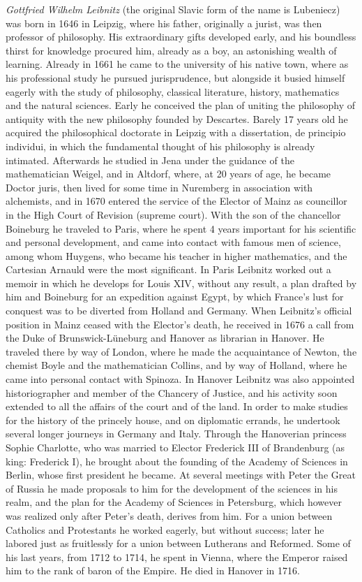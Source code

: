 \emph{Gottfried Wilhelm Leibnitz} (the original Slavic form of the
name is Lubeniecz) was born in 1646 in Leipzig, where his father,
originally a jurist, was then professor of philosophy. His
extraordinary gifts developed early, and his boundless thirst for
knowledge procured him, already as a boy, an astonishing wealth of
learning. Already in 1661 he came to the university of his native town,
where as his professional study he pursued jurisprudence, but alongside
it busied himself eagerly with the study of philosophy, classical
literature, history, mathematics and the natural sciences. Early he
conceived the plan of uniting the philosophy of antiquity with the new
philosophy founded by Descartes. Barely 17 years old he acquired the
philosophical doctorate in Leipzig with a dissertation, de principio
individui, in which the fundamental thought of his philosophy is already
intimated. Afterwards he studied in Jena under the guidance of the
mathematician Weigel, and in Altdorf, where, at 20 years of age, he
became Doctor juris, then lived for some time in Nuremberg in
association with alchemists, and in 1670 entered the service of the
Elector of Mainz as councillor in the High Court of Revision (supreme
court). With the son of the chancellor Boineburg he traveled to Paris,
where he spent 4 years important for his scientific and personal
development, and came into contact with famous men of science, among
whom Huygens, who became his teacher in higher mathematics, and the
Cartesian Arnauld were the most significant. In Paris Leibnitz worked
out a memoir in which he develops for Louis XIV, without any result, a
plan drafted by him and Boineburg for an expedition against Egypt, by
which France's lust for conquest was to be diverted from Holland and
Germany. When Leibnitz's official position in Mainz ceased with the
Elector's death, he received in 1676 a call from the Duke of
Brunswick-Lüneburg and Hanover as librarian in Hanover. He traveled
there by way of London, where he made the acquaintance of Newton, the
chemist Boyle and the mathematician Collins, and by way of Holland,
where he came into personal contact with Spinoza. In Hanover
Leibnitz was also appointed historiographer and member of the Chancery
of Justice, and his activity soon extended to all the affairs of the
court and of the land. In order to make studies for the history of the
princely house, and on diplomatic errands, he undertook several longer
journeys in Germany and Italy. Through the Hanoverian princess Sophie
Charlotte, who was married to Elector Frederick III of Brandenburg (as
king: Frederick I), he brought about the founding of the Academy of
Sciences in Berlin, whose first president he became. At several
meetings with Peter the Great of Russia he made proposals to him for the
development of the sciences in his realm, and the plan for the Academy
of Sciences in Petersburg, which however was realized only after Peter's
death, derives from him. For a union between Catholics and Protestants
he worked eagerly, but without success; later he labored just as
fruitlessly for a union between Lutherans and Reformed. Some of his last
years, from 1712 to 1714, he spent in Vienna, where the Emperor raised
him to the rank of baron of the Empire. He died in Hanover in 1716.

